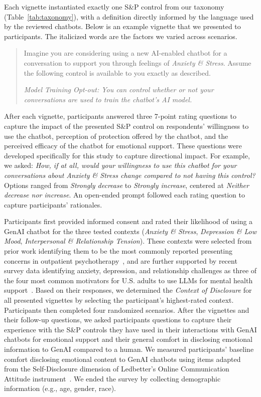 \documentclass[letterpaper,twocolumn,10pt]{article}
\begin{document}
 Each vignette instantiated exactly one S\&P control from our taxonomy (Table~\ref{tab:taxonomy}), with a definition directly informed by the language used by the reviewed chatbots. Below is an example vignette that we presented to participants. The italicized words are the factors we varied across scenarios. 

\begin{quote}
    Imagine you are considering using a new AI-enabled chatbot for a conversation to support you through feelings of \emph{Anxiety \& Stress}. Assume the following control is available to you exactly as described. 
    
    \emph{Model Training Opt-out: You can control whether or not your conversations are used to train the chatbot's AI model.}
\end{quote}

 After each vignette, participants answered three 7-point rating questions to capture the impact of the presented S\&P control on respondents' willingness to use the chatbot, perception of protection offered by the chatbot, and the perceived efficacy of the chatbot for emotional support. These questions were developed specifically for this study to capture directional impact. For example, we asked: \emph{How, if at all, would your willingness to use this chatbot for your conversations about \emph{Anxiety \& Stress} change compared to not having this control?} Options ranged from \emph{Strongly decrease} to \emph{Strongly increase}, centered at \emph{Neither decrease nor increase}. An open-ended prompt followed each rating question to capture participants' rationales.

 Participants first provided informed consent and rated their likelihood of using a GenAI chatbot for the three tested contexts (\emph{Anxiety \& Stress}, \emph{Depression \& Low Mood}, \emph{Interpersonal \& Relationship Tension}). These contexts were selected from prior work identifying them to be the most commonly reported presenting concerns in outpatient psychotherapy~\cite{cook2010psychotherapists, perez2017presenting}, and are further supported by recent survey data identifying anxiety, depression, and relationship challenges as three of the four most common motivators for U.S. adults to use LLMs for mental health support~\cite{rousmaniere2025large}. Based on their responses, we determined the \emph{Context of Disclosure} for all presented vignettes by selecting the participant's highest-rated context. Participants then completed four randomized scenarios. After the vignettes and their follow-up questions, we asked participants questions to capture their experience with the S\&P controls they have used in their interactions with GenAI chatbots for emotional support and their general comfort in disclosing emotional information to GenAI compared to a human. We measured participants' baseline comfort disclosing emotional content to GenAI chatbots using items adapted from the Self-Disclosure dimension of Ledbetter's Online Communication Attitude instrument~\cite{ledbetter2009measuring}. We ended the survey by collecting demographic information (e.g., age, gender, race). 
\end{document}
